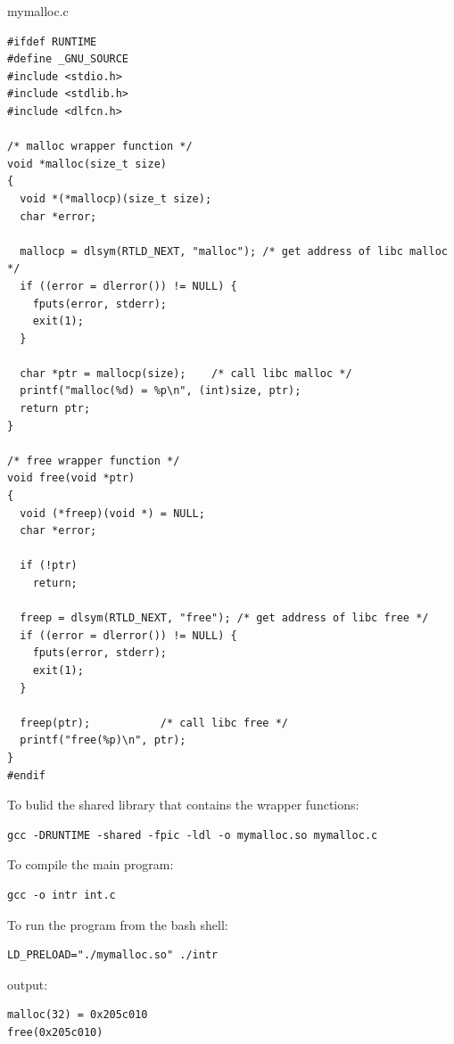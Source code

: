 \documentclass[11pt]{article}
\begin{document}
mymalloc.c\\
\begin{verbatim}
#ifdef RUNTIME
#define _GNU_SOURCE
#include <stdio.h>
#include <stdlib.h>
#include <dlfcn.h>

/* malloc wrapper function */
void *malloc(size_t size)
{
  void *(*mallocp)(size_t size);
  char *error;

  mallocp = dlsym(RTLD_NEXT, "malloc"); /* get address of libc malloc */
  if ((error = dlerror()) != NULL) {
    fputs(error, stderr);
    exit(1);
  }

  char *ptr = mallocp(size);	/* call libc malloc */
  printf("malloc(%d) = %p\n", (int)size, ptr);
  return ptr;
}

/* free wrapper function */
void free(void *ptr)
{
  void (*freep)(void *) = NULL;
  char *error;

  if (!ptr)
    return;

  freep = dlsym(RTLD_NEXT, "free"); /* get address of libc free */
  if ((error = dlerror()) != NULL) {
    fputs(error, stderr);
    exit(1);
  }

  freep(ptr);			/* call libc free */
  printf("free(%p)\n", ptr);
}
#endif
\end{verbatim}

To bulid the shared library that contains the wrapper functions:\\
\begin{verbatim}
gcc -DRUNTIME -shared -fpic -ldl -o mymalloc.so mymalloc.c 
\end{verbatim}

To compile the main program:\\
\begin{verbatim}
gcc -o intr int.c
\end{verbatim}

To run the program from the bash shell:\\
\begin{verbatim}
LD_PRELOAD="./mymalloc.so" ./intr
\end{verbatim}

output:\\
\begin{verbatim}
malloc(32) = 0x205c010
free(0x205c010)
\end{verbatim}
\end{document}
